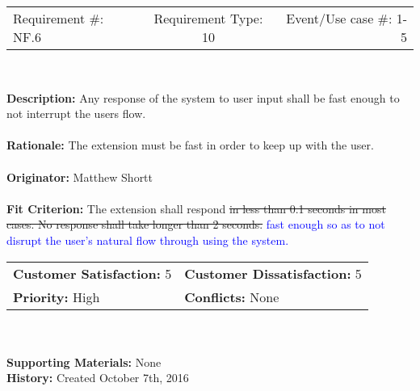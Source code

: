 \documentclass[12pt, titlepage]{article}
\begin{document}
\begin{framed}
	
	\begin{center}
		
		\begin{tabular}{ l c r }
			Requirement \#: NF.6 & Requirement Type: 10 & Event/Use case \#: 1-5 \\
		\end{tabular} \\
	\end{center}
	\textbf{Description:} Any response of the system to user input shall be fast enough to 
	not interrupt the users flow.\\
	\\
	\textbf{Rationale:} The extension must be fast in order to keep up with the user.  \\
	\\
	\textbf{Originator:} Matthew Shortt \\
	\\
	\textbf{Fit Criterion:} The extension shall respond \sout{in less than 0.1 
	seconds in most cases. No response shall take longer than 2 seconds. } 
	\textcolor{blue}{fast enough so as to not disrupt the user's natural flow 
	through using the system.}
	\\
	
	\begin{tabular}{ll}
		\textbf{Customer Satisfaction:} 5 & \textbf{Customer Dissatisfaction:} 5 \\
		\textbf{Priority:} High & \textbf{Conflicts:} None\\
	\end{tabular} \\
	\\
	\textbf{Supporting Materials:} None \\
	\textbf{History:} Created October 7th, 2016
	
\end{framed}
\end{document}
